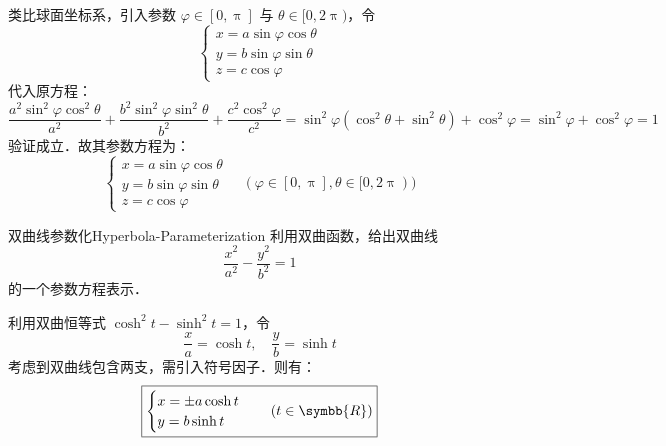 \begin{solution}
    类比球面坐标系，引入参数 $\varphi \in [0, \uppi]$ 与 $\theta \in [0, 2\uppi)$，令
    \begin{equation}
        \begin{cases}
            x = a \sin \varphi \cos \theta \\
            y = b \sin \varphi \sin \theta \\
            z = c \cos \varphi
        \end{cases}
    \end{equation}
    代入原方程：
    \begin{equation}
        \frac{a^2 \sin^2 \varphi \cos^2 \theta}{a^2} + \frac{b^2 \sin^2 \varphi \sin^2 \theta}{b^2} + \frac{c^2 \cos^2 \varphi}{c^2} = \sin^2 \varphi (\cos^2 \theta + \sin^2 \theta) + \cos^2 \varphi = \sin^2 \varphi + \cos^2 \varphi = 1
    \end{equation}
    验证成立．故其参数方程为：
    \begin{equation}
        \boxed{\begin{cases} x = a \sin \varphi \cos \theta \\ y = b \sin \varphi \sin \theta \\ z = c \cos \varphi \end{cases} \quad (\varphi \in [0, \uppi], \theta \in [0, 2\uppi))}
    \end{equation}
\end{solution}

\begin{problem}{双曲线参数化}{Hyperbola-Parameterization}
    利用双曲函数，给出双曲线
    \begin{equation}
        \frac{x^2}{a^2} - \frac{y^2}{b^2} = 1
    \end{equation}
    的一个参数方程表示．
\end{problem}

\begin{solution}
    利用双曲恒等式 $\cosh^2 t - \sinh^2 t = 1$，令
    \begin{equation}
        \frac{x}{a} = \cosh t, \quad \frac{y}{b} = \sinh t
    \end{equation}
    考虑到双曲线包含两支，需引入符号因子．则有：
    \begin{equation}
        \boxed{\begin{cases} x = \pm a \cosh t \\ y = b \sinh t \end{cases} \quad (t \in \symbb{R})}
    \end{equation}
\end{solution}

